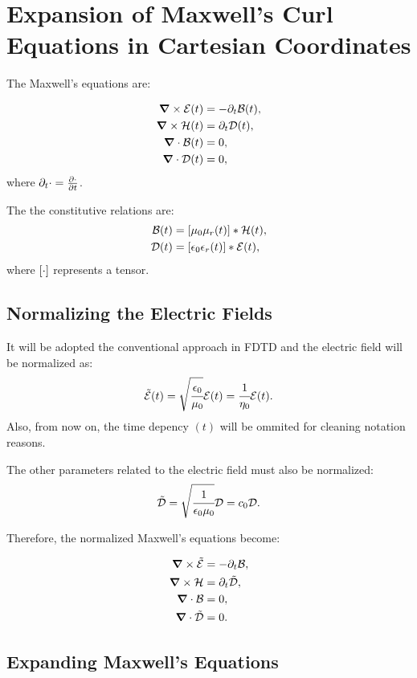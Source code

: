 \section{Expansion of Maxwell's Curl Equations in Cartesian Coordinates}

The Maxwell's equations are:

\begin{align}
    \bm{\nabla}\times \mathcal{E}(t) &= -\partial _t \mathcal{B}(t), \\
    \bm{\nabla}\times \mathcal{H}(t) &= \partial_t \mathcal{D}(t), \\
    \bm{\nabla}\cdot \mathcal{B}(t) &= 0, \\
    \bm{\nabla}\cdot \mathcal{D}(t) &= 0,
\end{align}
where $\partial_t\cdot = \frac{\partial \cdot}{\partial t}$.

The the constitutive relations are:
\begin{align}
    \Bt(t) &= \brackets{\mu_0\mu_r  (t)} \ast \Hht(t), \\
    \Dt(t) &= \brackets{\epsilon_0 \epsilon_r  (t)} \ast \Et(t),
\end{align}
where $\brackets{\cdot}$ represents a tensor.

\subsection{Normalizing the Electric Fields}
It will be adopted the conventional approach in FDTD and the electric field will be normalized as:
\begin{equation}
    \tilde{\mathcal{E}}(t) = \sqrt{\cfrac{\epsilon_0}{\mu_0}}\mathcal{E}(t) = \cfrac{1}{\eta_0}\mathcal{E}(t).
\end{equation}
Also, from now on, the time depency $(t)$ will be ommited for cleaning notation reasons.

The other parameters related to the electric field must also be normalized:
\begin{equation}
    \tilde{\mathcal{D}} = \sqrt{\cfrac{1}{\epsilon_0\mu_0}} \mathcal{D} = c_0 \mathcal{D}.
\end{equation}

Therefore, the normalized Maxwell's equations become:

\begin{align}
    \bm{\nabla}\times \tilde{\mathcal{E}} &= -\partial _t \mathcal{B}, \\
    \bm{\nabla}\times \mathcal{H} &= \partial_t \tilde{\mathcal{D}}, \\
    \bm{\nabla}\cdot \mathcal{B} &= 0, \\
    \bm{\nabla}\cdot \tilde{\mathcal{D}} &= 0.
\end{align}


\subsection{Expanding Maxwell's Equations}

